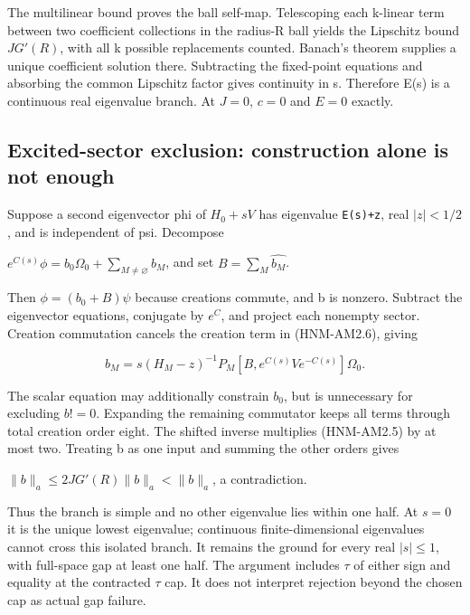 The multilinear bound proves the ball self-map. Telescoping each k-linear term between two coefficient collections in the radius-R ball yields the Lipschitz bound \(J G'(R)\), with all k possible replacements counted. Banach's theorem supplies a unique coefficient solution there. Subtracting the fixed-point equations and absorbing the common Lipschitz factor gives continuity in s. Therefore E(s) is a continuous real eigenvalue branch. At \(J=0\), \(c=0\) and \(E=0\) exactly.

\hypertarget{r29-am2-excited-sector-exclusion-construction-alone-is-not-enough}{%
\subsection{Excited-sector exclusion: construction alone is not enough}\label{r29:am2:r29-am2-excited-sector-exclusion-construction-alone-is-not-enough}}

Suppose a second eigenvector phi of \(H_0+sV\) has eigenvalue \texttt{E(s)+z}, real \(|z|<1/2\), and is independent of psi. Decompose

\(e^{C(s)}\phi=b_0\Omega_0+\sum_{M\ne\varnothing}b_M\), and set \(B=\sum_M\widehat{b_M}\).

Then \(\phi=(b_0+B)\psi\) because creations commute, and b is nonzero. Subtract the eigenvector equations, conjugate by \(e^C\), and project each nonempty sector. Creation commutation cancels the creation term in (HNM-AM2.6), giving

\begin{equation}
b_M=s(H_M-z)^{-1}P_M[B,e^{C(s)}Ve^{-C(s)}]\Omega_0.
\tag{HNM-AM2.10}
\label{r29:am2:eq10}
\end{equation}

The scalar equation may additionally constrain \(b_0\), but is unnecessary for excluding \(b!=0\). Expanding the remaining commutator keeps all terms through total creation order eight. The shifted inverse multiplies (HNM-AM2.5) by at most two. Treating b as one input and summing the other orders gives

\(\|b\|_a\le 2JG'(R)\|b\|_a<\|b\|_a\), a contradiction.

Thus the branch is simple and no other eigenvalue lies within one half. At \(s=0\) it is the unique lowest eigenvalue; continuous finite-dimensional eigenvalues cannot cross this isolated branch. It remains the ground for every real \(|s|\le 1\), with full-space gap at least one half. The argument includes \(\tau\) of either sign and equality at the contracted \(\tau\) cap. It does not interpret rejection beyond the chosen cap as actual gap failure.

